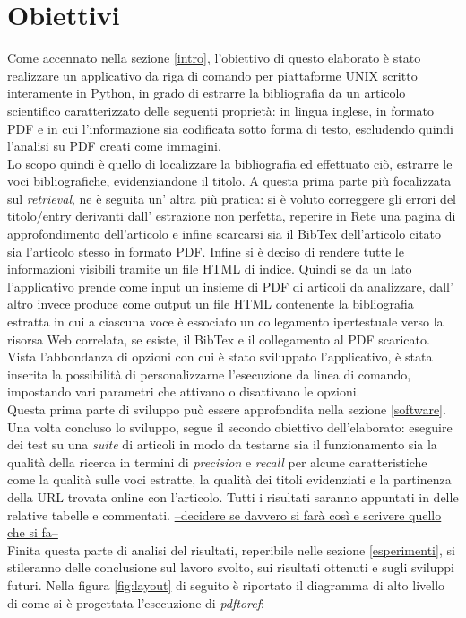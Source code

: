 \section{Obiettivi} \label{obiettivi}
Come accennato nella sezione \ref{intro}, l'obiettivo di questo elaborato è stato realizzare un applicativo da riga di comando per piattaforme UNIX scritto interamente in Python, in grado di estrarre la bibliografia da un articolo scientifico caratterizzato delle seguenti proprietà: in lingua inglese, in formato PDF e in cui l'informazione sia codificata sotto forma di testo, escludendo quindi l'analisi su PDF creati come immagini.\\ 
Lo scopo quindi è quello di localizzare la bibliografia ed effettuato ciò, estrarre le voci bibliografiche, evidenziandone il titolo. A questa prima parte più focalizzata sul \textit{retrieval}, ne è seguita un' altra più pratica: si è voluto correggere gli errori del titolo/entry derivanti dall' estrazione non perfetta, reperire in Rete una pagina di approfondimento dell'articolo e infine scarcarsi sia il BibTex dell'articolo citato sia l'articolo stesso in formato PDF. Infine si è deciso di rendere tutte le informazioni visibili tramite un file HTML di indice. Quindi se da un lato l'applicativo prende come input un insieme di PDF di articoli da analizzare, dall' altro invece produce come output un file HTML contenente la bibliografia estratta in cui a ciascuna voce è essociato un collegamento ipertestuale verso la risorsa Web correlata, se esiste, il BibTex e il collegamento al PDF scaricato.\\
Vista l'abbondanza di opzioni con cui è stato sviluppato l'applicativo, è stata inserita la possibilità di personalizzarne l'esecuzione da linea di comando, impostando vari parametri che attivano o disattivano le opzioni.\\ Questa prima parte di sviluppo può essere approfondita nella sezione \ref{software}.
Una volta concluso lo sviluppo, segue il secondo obiettivo dell'elaborato: eseguire dei test su una \textit{suite} di articoli in modo da testarne sia il funzionamento sia la qualità della ricerca in termini di \textit{precision} e \textit{recall} per alcune caratteristiche come la qualità sulle voci estratte, la qualità dei titoli evidenziati e la partinenza della URL trovata online con l'articolo. Tutti i risultati saranno appuntati in delle relative tabelle e commentati. \underline{--decidere se davvero si farà così e scrivere quello che si fa-- }\\
Finita questa parte di analisi del risultati, reperibile nelle sezione \ref{esperimenti}, si stileranno delle conclusione sul lavoro svolto, sui risultati ottenuti e sugli sviluppi futuri. Nella figura \ref{fig:layout} di seguito è riportato il diagramma di alto livello di come si è progettata l'esecuzione di \textit{pdftoref}:
